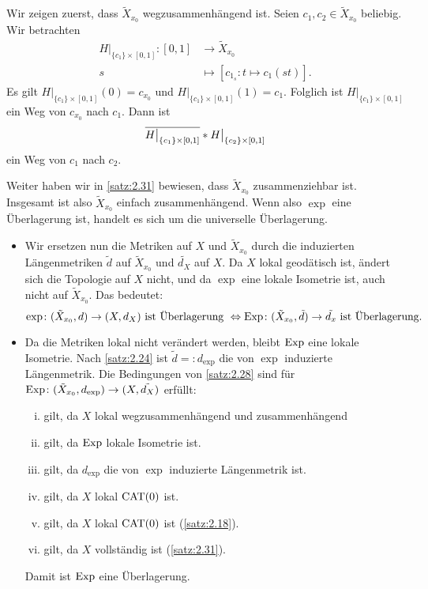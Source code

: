 \begin{beweis}
	Wir zeigen zuerst, dass $\tilde{X}_{x_0}$ wegzusammenhängend ist.
	Seien $c_1,c_2 \in \tilde{X}_{x_0}$ beliebig.
	Wir betrachten
	\begin{align*}
		H \big|_{\{c_1\} \times [0,1]} \colon [0,1] &\longrightarrow \tilde{X}_{x_0} \\
		s &\longmapsto [c_{1_s} \colon t \mapsto c_1(st)].
	\end{align*}
	Es gilt $H \big|_{\{c_1\} \times [0,1]}(0) = c_{x_0}$ und $H \big|_{\{c_1\} \times [0,1]}(1) = c_1$.
	Folglich ist $H\big|_{\{c_1\} \times [0,1]}$ ein Weg von $c_{x_0}$ nach $c_1$.
	Dann ist
	\[
		\overline{H \big|_{\{c_1\} \times [0,1]}} * H \big|_{\{c_2\} \times [0,1]}
	\] 
	ein Weg von $c_1$ nach $c_2$.
	
	Weiter haben wir in \autoref{satz:2.31} bewiesen, dass $\tilde{X}_{x_0}$ zusammenziehbar ist.
	Insgesamt ist also $\tilde{X}_{x_0}$ einfach zusammenhängend.
	Wenn also $\exp$ eine Überlagerung ist, handelt es sich um die universelle Überlagerung.
	\begin{itemize}
		\item Wir ersetzen nun die Metriken auf $X$ und $\tilde{X}_{x_0}$ durch die induzierten Längenmetriken $\tilde{d}$ auf $\tilde{X}_{x_0}$ und $\tilde{d_X}$ auf $X$.
		Da $X$ lokal geodätisch ist, ändert sich die Topologie auf $X$ nicht, und da $\exp$ eine lokale Isometrie ist, auch nicht auf $\tilde{X}_{x_0}$.
		Das bedeutet:
		\[
			\exp\colon (\tilde{X}_{x_0},d) \rightarrow (X,d_X) \text{ ist Überlagerung } \Leftrightarrow \operatorname{Exp}\colon (\tilde{X}_{x_0},\tilde{d}) \rightarrow \tilde{d_x} \text{ ist Überlagerung.}
		\]
		\item Da die Metriken lokal nicht verändert werden, bleibt $\operatorname{Exp}$ eine lokale Isometrie.
		Nach \autoref{satz:2.24} ist $\tilde{d} =: d_{\exp}$ die von $\exp$ induzierte Längenmetrik.
		Die Bedingungen von \autoref{satz:2.28} sind für $\operatorname{Exp}\colon (\tilde{X}_{x_0},d_{\exp}) \rightarrow (X,\tilde{d_X})$ erfüllt:
		\begin{enumerate}[(i)]
			\item gilt, da $X$ lokal wegzusammenhängend und zusammenhängend
			\item gilt, da $\operatorname{Exp}$ lokale Isometrie ist.
			\item gilt, da $d_{\exp}$ die von $\exp$ induzierte Längenmetrik ist.
			\item gilt, da $X$ lokal $\operatorname{CAT(0)}$ ist.
			\item gilt, da $X$ lokal $\operatorname{CAT(0)}$ ist (\autoref{satz:2.18}).
			\item gilt, da $X$ vollständig ist (\autoref{satz:2.31}).
		\end{enumerate}
		Damit ist $\operatorname{Exp}$ eine Überlagerung. \qedhere
	\end{itemize}
\end{beweis}

